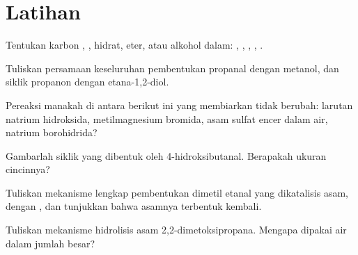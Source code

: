 \section{Latihan}

\begin{exercise}[$\star$]\label{exo:b1:acetals-protection:1}
Tentukan karbon , , hidrat, eter, atau alkohol dalam:
, , , ,
.
\end{exercise}

\begin{exercise}[$\star$]\label{exo:b1:acetals-protection:2}
Tuliskan persamaan keseluruhan pembentukan  propanal dengan
metanol, dan  siklik propanon dengan etana-1,2-diol.
\end{exercise}

\begin{exercise}[$\star$]\label{exo:b1:acetals-protection:3}
Pereaksi manakah di antara berikut ini yang membiarkan  tidak
berubah: larutan natrium hidroksida, metilmagnesium bromida, asam sulfat
encer dalam air, natrium borohidrida?
\end{exercise}

\begin{exercise}[$\star$]\label{exo:b1:acetals-protection:4}
Gambarlah  siklik yang dibentuk oleh 4-hidroksibutanal.
Berapakah ukuran cincinnya?
\end{exercise}

\begin{exercise}[$\star\star$]\label{exo:b1:acetals-protection:5}
Tuliskan mekanisme lengkap pembentukan dimetil  etanal yang
dikatalisis asam, dengan , dan tunjukkan bahwa asamnya
terbentuk kembali.
\end{exercise}

\begin{exercise}[$\star\star$]\label{exo:b1:acetals-protection:6}
Tuliskan mekanisme hidrolisis asam 2,2-dimetoksipropana. Mengapa dipakai
air dalam jumlah besar?
\end{exercise}

